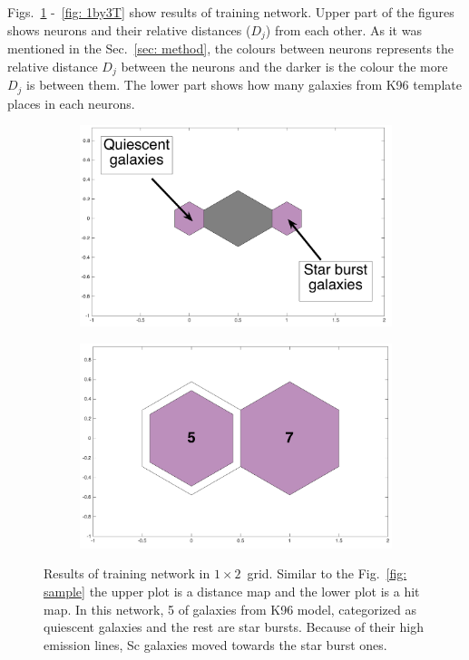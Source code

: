             Figs.~\ref{fig: 1by2T} -~\ref{fig: 1by3T} show results of training network.
            Upper part of the figures shows neurons and their relative distances ($D_j$) from each other.
            As it was mentioned in the Sec.~\ref{sec: method}, the colours between neurons represents the relative distance $D_j$ between the neurons and the darker is the colour the more $D_j$ is between them.
            The lower part shows how many galaxies from K96 template places in each neurons. 
            \begin{figure}
                \begin{subfigure}[b]{0.5\textwidth}
                    \centering
                    \includegraphics[width=\textwidth]{../images0.01/1d/dist_1_by_2.png}
                \end{subfigure}
                \hfill
                \begin{subfigure}[b]{0.5\textwidth}
                     \includegraphics[width=\textwidth]{../images0.01/1d/hit_t_1_by_2.png}
                \end{subfigure}
                \caption{Results of training network in $1\times2$~grid. Similar to the Fig.~\ref{fig: sample} the upper plot is a distance map and the lower plot is a hit map. In this network, 5 of galaxies from K96 model, categorized as quiescent galaxies and the rest are star bursts. Because of their high emission lines, Sc galaxies moved towards the star burst ones.}
                 \label{fig: 1by2T}
            \end{figure}
        
